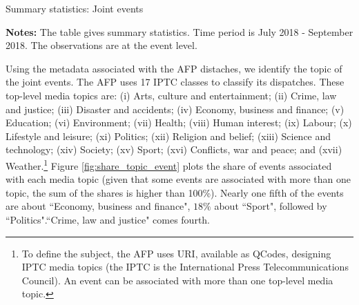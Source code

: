 \begin{table}
\caption{Summary statistics: Joint events\label{Tab:table_summary_joint_events}}
\begin{center}

\end{center}
\begin{spacing}{0.5}
{\fns \textbf{Notes:} The table gives summary statistics. Time period is July 2018 - September 2018. The observations are at the event level.}
\end{spacing}
\end{table} 

Using the metadata associated with the AFP distaches, we identify the topic of the joint events. The AFP uses 17 IPTC classes to classify its dispatches. These top-level media topics are: (i) Arts, culture and entertainment; (ii) Crime, law and justice; (iii) Disaster and accidents; (iv) Economy, business and finance; (v) Education; (vi) Environment; (vii) Health; (viii) Human interest; (ix) Labour; (x) Lifestyle and leisure; (xi) Politics; (xii) Religion and belief; (xiii) Science and technology; (xiv) Society; (xv) Sport; (xvi) Conflicts, war and peace; and (xvii) Weather.\footnote{To define the subject, the AFP uses URI, available as QCodes, designing IPTC media topics (the IPTC is the International Press Telecommunications Council). An event can be associated with more than one top-level media topic.} Figure \ref{fig:share_topic_event} plots the share of events associated with each media topic (given that some events are associated with more than one topic, the sum of the shares is higher than 100\%). Nearly one fifth of the events are about ``Economy, business and finance", $18\%$ about ``Sport", followed by ``Politics".``Crime, law and justice" comes fourth.

